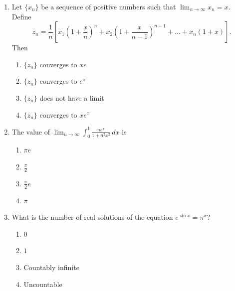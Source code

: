 \documentclass[11pt, a4paper]{article}
\begin{document}
\begin{enumerate}
  \item Let $\{x_n\}$ be a sequence of positive numbers such that $\lim_{n \to \infty} x_n = x$. Define
  \[
    z_n = \frac{1}{n}\left[x_1 \left(1 + \frac{x}{n}\right)^n + x_2 \left(1 + \frac{x}{n-1}\right)^{n-1} + \dots + x_n (1 + x)\right].
  \]
  Then
  \begin{enumerate}[label=(\alph*)]
    \item $\{z_n\}$ converges to $xe$
    \item $\{z_n\}$ converges to $e^x$
    \item $\{z_n\}$ does not have a limit
    \item $\{z_n\}$ converges to $x e^x$
  \end{enumerate}

  \item The value of $\displaystyle \lim_{n \to \infty} \int_0^1 \frac{n e^x}{1 + n^2 x^2}\,dx$ is
  \begin{enumerate}[label=(\alph*)]
    \item $\pi e$
    \item $\frac{\pi}{2}$
    \item $\frac{\pi}{2} e$
    \item $\pi$
  \end{enumerate}

  \item What is the number of real solutions of the equation $e^{\sin x} = \pi^x$?
  \begin{enumerate}[label=(\alph*)]
    \item $0$
    \item $1$
    \item Countably infinite
    \item Uncountable
  \end{enumerate}
\end{enumerate}
\end{document}
